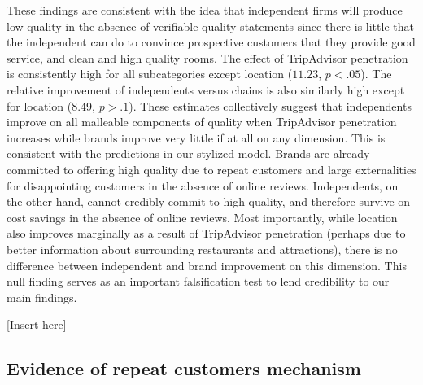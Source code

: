 \documentclass[12pt, leqno]{article}
\begin{document}
These findings are consistent with the idea that independent firms will produce low quality in the absence of verifiable quality statements since there is little that the independent can do to convince prospective customers that they provide good service, and clean and high quality rooms. The effect of TripAdvisor penetration is consistently high for all subcategories except location ($11.23$, $p<.05$). The relative improvement of independents versus chains is also similarly high except for location ($8.49$, $p>.1$). These estimates collectively suggest that independents improve on all malleable components of quality when TripAdvisor penetration increases while brands improve very little if at all on any dimension. This is consistent with the predictions in our stylized model. Brands are already committed to offering high quality due to repeat customers and large externalities for disappointing customers in the absence of online reviews. Independents, on the other hand, cannot credibly commit to high quality, and therefore survive on cost savings in the absence of online reviews. Most importantly, while location also improves marginally as a result of TripAdvisor penetration (perhaps due to better information about surrounding restaurants and attractions), there is no difference between independent and brand improvement on this dimension. This null finding serves as an important falsification test to lend credibility to our main findings.

[Insert  here]

\subsection{Evidence of repeat customers mechanism}
\end{document}

